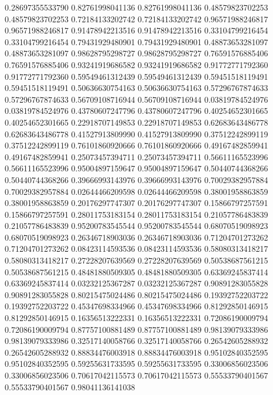    0.28697355533790   0.82761998041136
   0.82761998041136   0.48579823702253
   0.48579823702253   0.72184133202742
   0.72184133202742   0.96571988246817
   0.96571988246817   0.91478942213516
   0.91478942213516   0.33104799216454
   0.33104799216454   0.79431929480901
   0.79431929480901   0.48873653281097
   0.48873653281097   0.98628795298727
   0.98628795298727   0.76591576885406
   0.76591576885406   0.93241919686582
   0.93241919686582   0.91772771792360
   0.91772771792360   0.59549461312439
   0.59549461312439   0.59451518119491
   0.59451518119491   0.50636630754163
   0.50636630754163   0.57296767874633
   0.57296767874633   0.56709108716944
   0.56709108716944   0.03819784524976
   0.03819784524976   0.43780607247796
   0.43780607247796   0.40254652301665
   0.40254652301665   0.22918707149853
   0.22918707149853   0.62683643486778
   0.62683643486778   0.41527913809990
   0.41527913809990   0.37512242899119
   0.37512242899119   0.76101860920666
   0.76101860920666   0.49167482859941
   0.49167482859941   0.25073457394711
   0.25073457394711   0.56611165523996
   0.56611165523996   0.95004897159647
   0.95004897159647   0.50440744368266
   0.50440744368266   0.39666993143976
   0.39666993143976   0.70029382957884
   0.70029382957884   0.02644466209598
   0.02644466209598   0.38001958863859
   0.38001958863859   0.20176297747307
   0.20176297747307   0.15866797257591
   0.15866797257591   0.28011753183154
   0.28011753183154   0.21057786483839
   0.21057786483839   0.95200783545544
   0.95200783545544   0.68070519098923
   0.68070519098923   0.26346718903036
   0.26346718903036   0.71204701273262
   0.71204701273262   0.08423114593536
   0.08423114593536   0.58080313418217
   0.58080313418217   0.27228207639569
   0.27228207639569   0.50538687561215
   0.50538687561215   0.48481880509305
   0.48481880509305   0.63369245837414
   0.63369245837414   0.03232125367287
   0.03232125367287   0.90891283055828
   0.90891283055828   0.80215475024486
   0.80215475024486   0.19392752203722
   0.19392752203722   0.45347698334966
   0.45347698334966   0.81292850146915
   0.81292850146915   0.16356513222331
   0.16356513222331   0.72086190009794
   0.72086190009794   0.87757100881489
   0.87757100881489   0.98139079333986
   0.98139079333986   0.32517140058766
   0.32517140058766   0.26542605288932
   0.26542605288932   0.88834476003918
   0.88834476003918   0.95102840352595
   0.95102840352595   0.59255631733595
   0.59255631733595   0.33006856023506
   0.33006856023506   0.70617042115573
   0.70617042115573   0.55533790401567
   0.55533790401567   0.98041136141038
